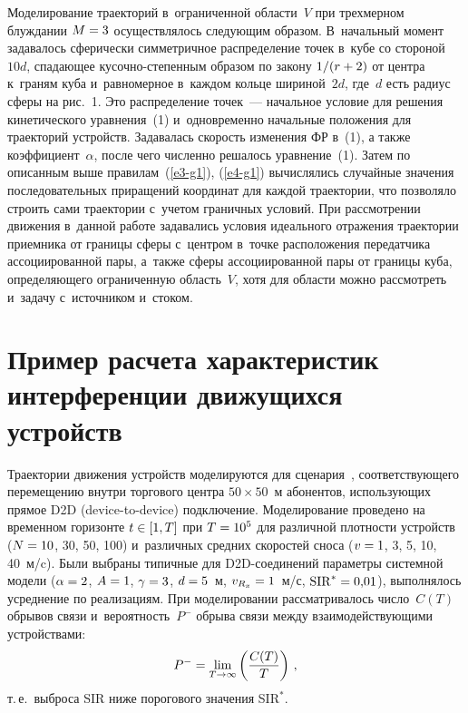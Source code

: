 \begin{multicols}{2}
  Моделирование траекторий в~ограниченной области~$V$ при трехмерном 
блуждании $M\hm=3$ осуществлялось следующим образом. В~начальный 
момент задавалось сферически симметричное распределение точек в~кубе со 
стороной~$10d$, спа\-да\-ющее ку\-соч\-но-сте\-пен\-ным образом по закону 
$1/(r\hm+2)$ от центра к~граням куба и~равномерное в~каждом кольце 
шириной~$2d$, где~$d$ есть радиус сферы на рис.~1. Это распределение 
точек~--- начальное условие для решения кинетического уравнения~(1) 
и~одновременно начальные положения для траекторий устройств. Задавалась 
скорость изменения ФР в~(1), а также 
коэффициент~$\alpha$, после чего численно решалось уравнение~(1). Затем по 
описанным выше правилам~(\ref{e3-g1}), (\ref{e4-g1}) вычислялись случайные 
значения последовательных приращений координат для каждой траектории, что 
позволяло строить сами траектории с~учетом граничных усло\-вий. При 
рассмотрении движения в~данной работе задавались усло\-вия идеального 
отражения траектории приемника от границы сферы с~цент\-ром в~точке 
расположения передатчика ас\-со\-ци\-иро\-ван\-ной пары, а~также сферы 
ассоциированной пары от границы куба, определяющего ограниченную 
область~$V$, хотя для области можно рассмотреть и~задачу с~источником 
и~стоком.

\section{Пример расчета характеристик интерференции движущихся 
устройств}

  Траектории движения устройств моделируются для сценария~\cite{14-g1}, 
соответствующего перемещению внутри торгового центра $50\times 50$~м 
абонентов, использующих прямое D2D (device-to-device) под\-клю\-че\-ние. Моделирование 
проведено на временном горизонте $t\hm\in [1,T]$ при $T\hm=10^5$ для 
различной плотности устройств ($N\hm = 10$, 30, 50, 100) и~различных средних 
скоростей сноса ($v\hm = 1$, 3, 5, 10, 40~м/c). Были выбраны типичные для 
D2D-со\-еди\-не\-ний параметры системной модели ($\alpha\hm = 2$, $A\hm = 
1$, $\gamma\hm = 3$, $d\hm = 5$~м, $v_{R_x}\hm= 1$~м/с, $\mathrm{SIR}^*\hm= 0{,}01$), 
выполнялось усреднение по реализациям. При моделировании рассматривалось 
число~$C(T)$ обрывов связи и~вероятность~$P^{-}$ обрыва связи между 
взаимодействующими устройствами:
$$
P^- = \lim\limits_{T\to \infty} 
\left(\displaystyle\frac{\displaystyle C(T)\mathstrut}{\displaystyle T\mathstrut}\right)\,,
$$
 т.\,е.\ выброса SIR ниже порогового значения SIR$^*$. 


\end{multicols}
